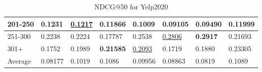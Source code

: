 \begin{table*}[]
\begin{tabular}{|l|l|l|l|l|l|l||l|}
        201-250 & \textbf{0.1231}                & \underline{0.1217}             & 0.11866                        & 0.1009                         & 0.09105                        & 0.09490                         & 0.11999                    \\ \hline
        251-300 & 0.2238                         & 0.2224                         & 0.17787                        & 0.2538                         & \underline{0.2806}             & \textbf{0.2917}                 & 0.21693                    \\ \hline
        301+    & 0.1752                         & 0.1989                         & \textbf{0.21585}               & \underline{0.2093}             & 0.1719                         & 0.1880                          & 0.23305                    \\ \hline
        Average & 0.08177                        & 0.1019                         & 0.1086                         & 0.09956                        & 0.08863                        & 0.0819                          & 0.1089                     \\ \hline
    \end{tabular}
    \caption{NDCG@50 for Yelp2020}
    \label{tab:yelp2020-ndcg-evaluation}
\end{table*}

